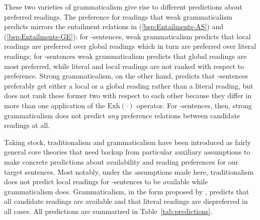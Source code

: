 \documentclass[fleqn,reqno,10pt]{article}
\newcommand{\as}{\acro{as}}
\renewcommand{\es}{\acro{es}}
\newcommand{\exh}{\ensuremath{\mathrm{Exh}}}
\begin{document}
These two varieties of grammaticalism give rise to different
predictions about preferred readings. The preference for readings that
weak grammaticalism predicts mirrors the entailment relations in
(\ref{bsp:Entailments-AS}) and (\ref{bsp:Entailments-GE}): for
\as-sentences, weak grammaticalism predicts that local readings are
preferred over global readings which in turn are preferred over
literal readings; for \es-sentences weak grammaticalism predicts that
global readings are most preferred, while literal and local readings
are not ranked with respect to preference. Strong grammaticalism, on
the other hand, predicts that \as-sentences preferably get either a
local or a global reading rather than a literal reading, but does not
rank these former two with respect to each other because they differ
in more than one application of the $\exh(\cdot)$ operator. For
\es-sentences, then, strong grammaticalism does not predict \emph{any}
preference relations between candidate readings at all.

\medskip

Taking stock, traditionalism and grammaticalism have been introduced
as fairly general core theories that need backup from particular
auxiliary assumptions to make concrete predictions about availability
and reading preferences for our target sentences. Most notably, under
the assumptions made here, traditionalism does not predict local
readings for \es-sentences to be available while grammaticalism does.
Grammaticalism, in the form proposed by
\citet{ChierchiaFox2008:The-Grammatical}, predicts that all candidate
readings are available and that literal readings are dispreferred in
all cases. All predictions are summarized in
Table~\ref{tab:predictions}.
\end{document}
